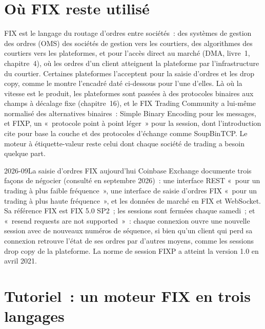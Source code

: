 \section{Où FIX reste utilisé}

FIX est le langage du routage d'ordres entre sociétés~: des systèmes de gestion des ordres (OMS) des sociétés de gestion vers les courtiers,
des algorithmes des courtiers vers les plateformes, et pour l'accès direct au marché (DMA, livre~1, chapitre~4), où les ordres d'un client
atteignent la plateforme par l'infrastructure du courtier. Certaines plateformes l'acceptent pour la saisie d'ordres et les drop copy, comme le montre
l'encadré daté ci-dessous pour l'une d'elles. Là où la vitesse est le produit, les plateformes sont passées à des protocoles binaires aux champs à décalage fixe (chapitre~16),
et le FIX Trading Community a lui-même normalisé des alternatives binaires~: Simple Binary Encoding pour les messages, et FIXP, un «~protocole point à point léger~»
pour la session, dont l'introduction cite pour base la couche 
et des protocoles d'échange comme SoupBinTCP. Le moteur à étiquette-valeur reste
celui dont chaque société de trading a besoin quelque part.

\begin{dated}{2026-09}{La saisie d'ordres FIX aujourd'hui}\label{dat:ll:protocols-i-fix:today}
Coinbase Exchange documente trois façons de négocier (consulté en septembre 2026)~: une interface REST «~pour un trading à plus faible fréquence~»,
une interface de saisie d'ordres FIX «~pour un trading à plus haute fréquence~», et les données de marché en FIX et WebSocket. Sa référence FIX
est FIX 5.0 SP2~; les sessions sont fermées chaque samedi~; et «~resend requests are not supported~»~: chaque connexion ouvre une nouvelle session
avec de nouveaux numéros de séquence, si bien qu'un client qui perd sa connexion retrouve l'état de ses ordres par d'autres moyens,
comme les sessions drop copy de la plateforme. La norme de session FIXP a atteint la version 1.0 en avril 2021.
\end{dated}

\section{Tutoriel~: un moteur FIX en trois langages}\label{tut:ll:protocols-i-fix:tut}

